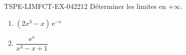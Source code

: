 \begin{exercice}{TSPE-LIMFCT-EX-042}{2}{12}
Déterminer les limites en $+\infty$.
\begin{enumerate}
  \item $(2x^3 - x)\,\mathrm{e}^{-x}$
  \item $\dfrac{\mathrm{e}^x}{x^3 - x + 1}$
\end{enumerate}
\end{exercice}
